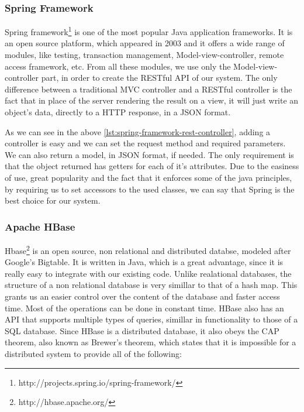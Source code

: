 \subsubsection{Spring Framework}
\label{sec:frameworks-spring-framework}
Spring framework\footnote{http://projects.spring.io/spring-framework/} is one of the most popular Java application frameworks. It is an open source platform, which appeared in 2003 and it offers a wide range of modules, like testing, transaction management, Model-view-controller, remote access framework, etc. 
From all these modules, we use only the Model-view-controller part, in order to create the RESTful API of our system.
The only difference between a traditional MVC controller and a RESTful controller is the fact that in place of the server rendering the result on a view, it will just write an object's data, directly to a HTTP response, in a JSON format.
\lstset{caption=Spring framework REST controller code, label=lst:spring-framework-rest-controller}

As we can see in the above \autoref{lst:spring-framework-rest-controller}, adding a controller is easy and we can set the request method and required parameters.
We can also return a model, in JSON format, if needed. The only requirement is that the object returned has getters for each of it's attributes.
Due to the easiness of use, great popularity and the fact that it enforces some of the java principles, by requiring us to set accessors to the used classes, we can say that Spring is the best choice for our system. 

\subsubsection{Apache HBase}
\label{sec:frameworks-hbase}
Hbase\footnote{http://hbase.apache.org/} is an open source, non relational and distributed databse, modeled after Google's Bigtable\cite{google-big-table}. It is written in Java, which is a great advantage, since it is really easy to integrate with our existing code.
Unlike realational databases, the structure of a non relational database is very simillar to that of a hash map. This grants us an easier control over the content of the database and faster access time. Most of the operations can be done in constant time. HBase also has an API that supports multiple types of queries, simillar in functionality to those of a SQL database.
Since HBase is a distributed database, it also obeys the CAP theorem, also known as Brewer's theorem, which states that it is impossible for a distributed system to provide all of the following:

